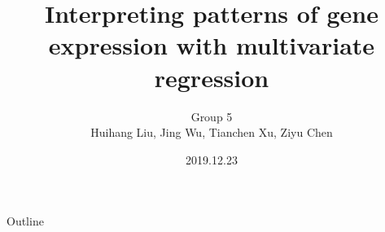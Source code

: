 \title[SOM]{Interpreting patterns of gene expression with multivariate regression}
\author[Group 5]{{\scriptsize Group 5} \\ Huihang Liu, Jing Wu, Tianchen Xu, Ziyu Chen}
\date{2019.12.23}
\maketitle



        
        
        
        
        
        
        


\begin{frame}{Outline}
    \tableofcontents
\end{frame}



